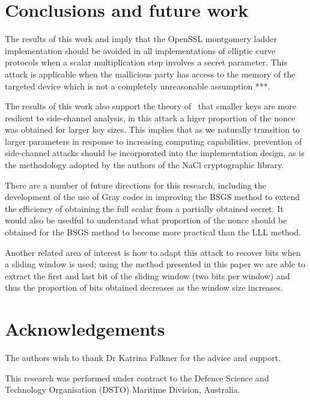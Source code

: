 \documentclass{llncs}
\newcommand{\starpar}[1]{\par{\footnotesize $\star$ \hl{#1}\par}}
\begin{document}
\section{Conclusions and future work}
The results of this work and \cite{brumley11remote} imply that the OpenSSL montgomery ladder implementation should be avoided in all implementations of elliptic curve protocols when a scalar multiplication step involves a secret parameter. This attack is applicable when the mallicious party has access to the memory of the targeted device which is not a completely unreasonable assumption ***. 

The results of this work also support the theory of~\cite{walter04longer} that smaller keys are more resilient to side-channel analysis, in this attack a higer proportion of the nonce was obtained for larger key sizes. This implies that as we naturally transition to larger parameters in response to increasing computing capabilities, prevention of side-channel attacks should be incorporated into the implementation design, as is the methodology adopted by the authors of the NaCl cryptographic library. 

There are a number of future directions for this research, including the development of the use of Gray codes in improving the BSGS method to extend the efficiency of obtaining the full scalar from a partially obtained secret. It would also be usedful to understand what proportion of the nonce should be obtained for the BSGS method to become more practical than the LLL method. 

Another related area of interest is how to adapt this attack to recover bits when a sliding window is used; using the method presented in this paper we are able to extract the first and last bit of the sliding window (two bits per window) and thus the proportion of bits obtained decreases as the window size increases. 



\section*{Acknowledgements}
The authors wish to thank Dr Katrina Falkner for the advice and support.

This research was performed under contract to the Defence
Science and Technology Organisation (DSTO) Maritime Division,
Australia.




\end{document}
